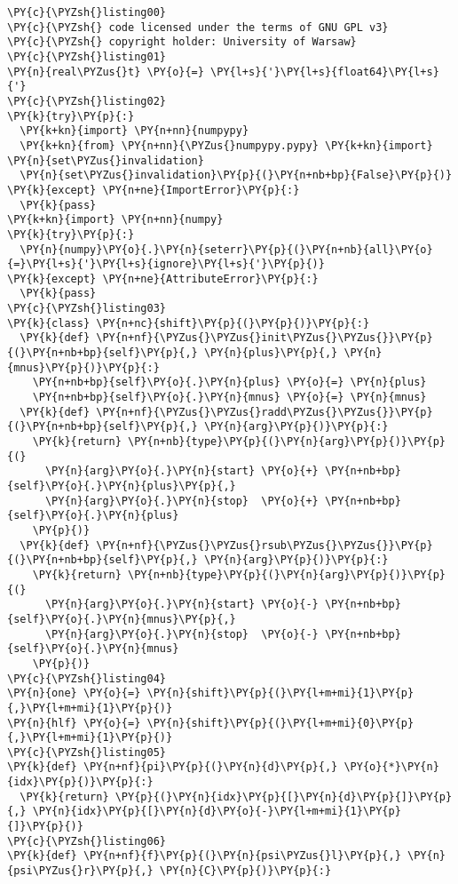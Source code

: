 \begin{Verbatim}[commandchars=\\\{\}]
\PY{c}{\PYZsh{}listing00}
\PY{c}{\PYZsh{} code licensed under the terms of GNU GPL v3}
\PY{c}{\PYZsh{} copyright holder: University of Warsaw}
\PY{c}{\PYZsh{}listing01}
\PY{n}{real\PYZus{}t} \PY{o}{=} \PY{l+s}{'}\PY{l+s}{float64}\PY{l+s}{'}
\PY{c}{\PYZsh{}listing02}
\PY{k}{try}\PY{p}{:}
  \PY{k+kn}{import} \PY{n+nn}{numpypy}
  \PY{k+kn}{from} \PY{n+nn}{\PYZus{}numpypy.pypy} \PY{k+kn}{import} \PY{n}{set\PYZus{}invalidation}
  \PY{n}{set\PYZus{}invalidation}\PY{p}{(}\PY{n+nb+bp}{False}\PY{p}{)}
\PY{k}{except} \PY{n+ne}{ImportError}\PY{p}{:}
  \PY{k}{pass}
\PY{k+kn}{import} \PY{n+nn}{numpy}
\PY{k}{try}\PY{p}{:} 
  \PY{n}{numpy}\PY{o}{.}\PY{n}{seterr}\PY{p}{(}\PY{n+nb}{all}\PY{o}{=}\PY{l+s}{'}\PY{l+s}{ignore}\PY{l+s}{'}\PY{p}{)}
\PY{k}{except} \PY{n+ne}{AttributeError}\PY{p}{:}
  \PY{k}{pass}
\PY{c}{\PYZsh{}listing03}
\PY{k}{class} \PY{n+nc}{shift}\PY{p}{(}\PY{p}{)}\PY{p}{:}
  \PY{k}{def} \PY{n+nf}{\PYZus{}\PYZus{}init\PYZus{}\PYZus{}}\PY{p}{(}\PY{n+nb+bp}{self}\PY{p}{,} \PY{n}{plus}\PY{p}{,} \PY{n}{mnus}\PY{p}{)}\PY{p}{:}
    \PY{n+nb+bp}{self}\PY{o}{.}\PY{n}{plus} \PY{o}{=} \PY{n}{plus}
    \PY{n+nb+bp}{self}\PY{o}{.}\PY{n}{mnus} \PY{o}{=} \PY{n}{mnus}
  \PY{k}{def} \PY{n+nf}{\PYZus{}\PYZus{}radd\PYZus{}\PYZus{}}\PY{p}{(}\PY{n+nb+bp}{self}\PY{p}{,} \PY{n}{arg}\PY{p}{)}\PY{p}{:} 
    \PY{k}{return} \PY{n+nb}{type}\PY{p}{(}\PY{n}{arg}\PY{p}{)}\PY{p}{(}
      \PY{n}{arg}\PY{o}{.}\PY{n}{start} \PY{o}{+} \PY{n+nb+bp}{self}\PY{o}{.}\PY{n}{plus}\PY{p}{,} 
      \PY{n}{arg}\PY{o}{.}\PY{n}{stop}  \PY{o}{+} \PY{n+nb+bp}{self}\PY{o}{.}\PY{n}{plus}
    \PY{p}{)}
  \PY{k}{def} \PY{n+nf}{\PYZus{}\PYZus{}rsub\PYZus{}\PYZus{}}\PY{p}{(}\PY{n+nb+bp}{self}\PY{p}{,} \PY{n}{arg}\PY{p}{)}\PY{p}{:} 
    \PY{k}{return} \PY{n+nb}{type}\PY{p}{(}\PY{n}{arg}\PY{p}{)}\PY{p}{(}
      \PY{n}{arg}\PY{o}{.}\PY{n}{start} \PY{o}{-} \PY{n+nb+bp}{self}\PY{o}{.}\PY{n}{mnus}\PY{p}{,} 
      \PY{n}{arg}\PY{o}{.}\PY{n}{stop}  \PY{o}{-} \PY{n+nb+bp}{self}\PY{o}{.}\PY{n}{mnus}
    \PY{p}{)}
\PY{c}{\PYZsh{}listing04}
\PY{n}{one} \PY{o}{=} \PY{n}{shift}\PY{p}{(}\PY{l+m+mi}{1}\PY{p}{,}\PY{l+m+mi}{1}\PY{p}{)} 
\PY{n}{hlf} \PY{o}{=} \PY{n}{shift}\PY{p}{(}\PY{l+m+mi}{0}\PY{p}{,}\PY{l+m+mi}{1}\PY{p}{)}
\PY{c}{\PYZsh{}listing05}
\PY{k}{def} \PY{n+nf}{pi}\PY{p}{(}\PY{n}{d}\PY{p}{,} \PY{o}{*}\PY{n}{idx}\PY{p}{)}\PY{p}{:} 
  \PY{k}{return} \PY{p}{(}\PY{n}{idx}\PY{p}{[}\PY{n}{d}\PY{p}{]}\PY{p}{,} \PY{n}{idx}\PY{p}{[}\PY{n}{d}\PY{o}{-}\PY{l+m+mi}{1}\PY{p}{]}\PY{p}{)}
\PY{c}{\PYZsh{}listing06}
\PY{k}{def} \PY{n+nf}{f}\PY{p}{(}\PY{n}{psi\PYZus{}l}\PY{p}{,} \PY{n}{psi\PYZus{}r}\PY{p}{,} \PY{n}{C}\PY{p}{)}\PY{p}{:}

\end{Verbatim}
